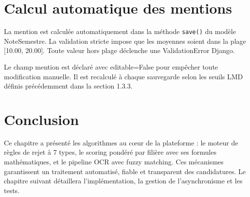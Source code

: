 \section{Calcul automatique des mentions}
La mention est calculée automatiquement dans la méthode \texttt{save()} du modèle NoteSemestre. La validation stricte impose que les moyennes soient dans la plage [10.00, 20.00]. Toute valeur hors plage déclenche une ValidationError Django.

Le champ mention est déclaré avec editable=False pour empêcher toute modification manuelle. Il est recalculé à chaque sauvegarde selon les seuils LMD définis précédemment dans la section 1.3.3.

\section{Conclusion}
Ce chapitre a présenté les algorithmes au cœur de la plateforme : le moteur de règles de rejet à 7 types, le scoring pondéré par filière avec ses formules mathématiques, et le pipeline OCR avec fuzzy matching. Ces mécanismes garantissent un traitement automatisé, fiable et transparent des candidatures. Le chapitre suivant détaillera l'implémentation, la gestion de l'asynchronisme et les tests.
